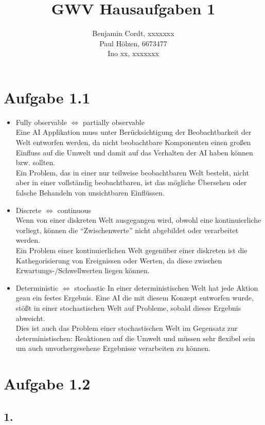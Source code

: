 \documentclass[12pt, paper=a4]{article}
\author{Benjamin Cordt, xxxxxxx\\Paul Hölzen, 6673477\\Ino xx, xxxxxxx}
\title{GWV Hausaufgaben 1}
\begin{document}
\maketitle

\section*{Aufgabe 1.1}
\begin{itemize}
\item Fully observable $\Leftrightarrow$ partially observable\\
      Eine AI Applikation muss unter Berücksichtigung der Beobachtbarkeit der Welt entworfen werden, da
      nicht beobachtbare Komponenten einen großen Einfluss auf die Umwelt und damit auf das Verhalten der
      AI haben können bzw. sollten.\\
      Ein Problem, das in einer nur teilweise beobachtbaren Welt besteht, nicht aber in einer vollständig
      beobachtbaren, ist das mögliche Übersehen oder falsche Behandeln von unsichtbaren Einflüssen.
\item Discrete $\Leftrightarrow$ continuous\\
      Wenn von einer diskreten Welt ausgegangen wird, obwohl eine kontinuierliche vorliegt, können die
      ``Zwischenwerte'' nicht abgebildet oder verarbeitet werden.\\
      Ein Problem einer kontinuierlichen Welt gegenüber einer diskreten ist die Kathegorisierung von
      Ereignissen oder Werten, da diese zwischen Erwartungs-/Schwellwerten liegen können.
\item Deterministic $\Leftrightarrow$ stochastic
      In einer deterministischen Welt hat jede Aktion geau ein festes Ergebnis. Eine AI die mit diesem
      Konzept entworfen wurde, stößt in einer stochastischen Welt auf Probleme, sobald dieses Ergebnis
      abweicht.\\
      Dies ist auch das Problem einer stochastischen Welt im Gegensatz zur deterministischen: Reaktionen
      auf die Umwelt und müssen sehr flexibel sein um auch unvorhergesehene Ergebnisse verarbeiten zu
      können.
\end{itemize}

\section*{Aufgabe 1.2}
\subsection*{1.}
\end{document}
